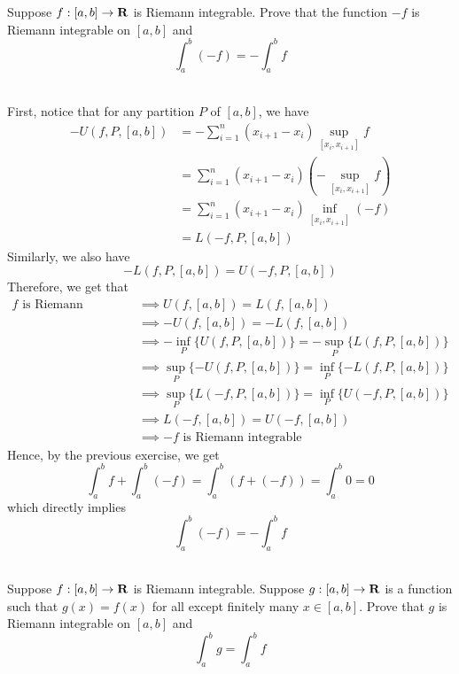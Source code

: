 \begin{exercise}
    Suppose $f : [a,b] \to \mathbf{R}$ is Riemann integrable. Prove that the function $-f$ is Riemann integrable on $[a,b]$ and 
    $$\int_{a}^{b}(-f) = -\int_{a}^{b}f$$
\end{exercise}

\begin{solution}
    \\ First, notice that for any partition $P$ of $[a,b]$, we have
    \begin{align*}
        -U(f, P, [a,b]) &= - \sum_{i=1}^n (x_{i+1} - x_i) \sup_{[x_i, x_{i+1}]}f \\
        &= \sum_{i=1}^n (x_{i+1} - x_i)\left(-\sup_{[x_i, x_{i+1}]}f\right)  \\
        &= \sum_{i=1}^n (x_{i+1} - x_i)\inf_{[x_i, x_{i+1}]}(-f)  \\
        &= L(-f, P, [a,b])
    \end{align*}
    Similarly, we also have
    $$-L(f, P, [a,b]) = U(-f, P, [a,b])$$
    Therefore, we get that 
    \begin{align*}
        f \text{ is Riemann integrable} &\implies U(f, [a,b]) = L(f, [a,b]) \\
        &\implies -U(f, [a,b]) = -L(f, [a,b]) \\
        &\implies - \inf_P\{U(f, P, [a,b])\} = - \sup_P\{L(f, P, [a,b])\} \\
        &\implies \sup_P\{ - U(f, P, [a,b])\} = \inf_P\{ - L(f, P, [a,b])\} \\
        &\implies \sup_P\{L(-f, P, [a,b])\} = \inf_P\{ U(-f, P, [a,b])\} \\
        &\implies L(-f, [a,b]) = U(-f, [a,b])\\
        &\implies -f \text{ is Riemann integrable}
    \end{align*}
    Hence, by the previous exercise, we get
    $$\int_{a}^{b}f + \int_{a}^{b}(-f) = \int_{a}^{b}(f + (-f)) = \int_{a}^{b}0 = 0$$
    which directly implies 
    $$\int_{a}^{b}(-f) = - \int_{a}^{b}f$$ \\
\end{solution}

\begin{exercise}
    Suppose $f : [a,b] \to \mathbf{R}$ is Riemann integrable. Suppose $g : [a,b] \to \mathbf{R}$ is a function such that $g(x) = f(x)$ for all except finitely many $x \in [a,b]$. Prove that $g$ is Riemann integrable on $[a,b]$ and 
    $$\int_{a}^{b}g = \int_{a}^{b}f$$
\end{exercise}


